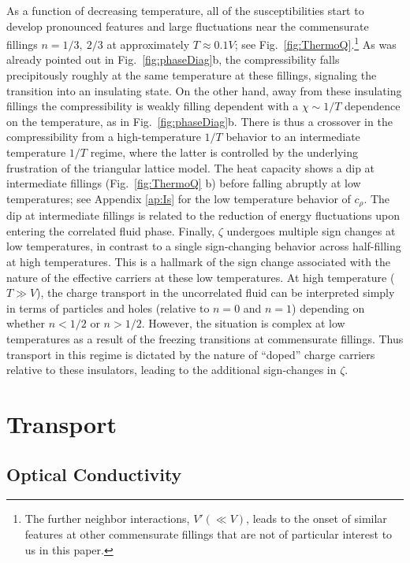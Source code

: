 \documentclass[aps,prx,onecolumn,amsmath,nofootinbib,amssymb,11pt]{revtex4-1}
\begin{document}
{As a function of decreasing temperature, all of the susceptibilities start to develop pronounced features and large fluctuations near the commensurate fillings $n=1/3,~2/3$ at approximately $T\approx 0.1V$; see Fig.~\ref{fig:ThermoQ}.\footnote{\textsf{The further neighbor interactions, $V'(\ll V)$, leads to the onset of similar features at other commensurate fillings that are not of particular interest to us in this paper.}} As was already pointed out in Fig.~\ref{fig:phaseDiag}b, the compressibility falls precipitously roughly at the same temperature at these fillings, signaling the transition into an insulating state. On the other hand, away from these insulating fillings the compressibility is weakly filling dependent with a $\chi\sim 1/T$ dependence on the temperature, as in Fig.~\ref{fig:phaseDiag}b. There is thus a crossover in the compressibility from a high-temperature $1/T$ behavior to an intermediate temperature $1/T$ regime, where the latter is controlled by the underlying frustration of the triangular lattice model. The heat capacity shows a dip at intermediate fillings (Fig.~\ref{fig:ThermoQ} b) before falling abruptly at low temperatures; see Appendix \ref{ap:Is} for the low temperature behavior of $c_\rho$. The dip at intermediate fillings is related to the reduction of energy fluctuations upon entering the correlated fluid phase. Finally, $\zeta$ undergoes multiple sign changes at low temperatures, in contrast to a single sign-changing behavior across half-filling at high temperatures. This is a hallmark of the sign change associated with the nature of the effective carriers at these low temperatures. At high temperature ($T\gg V$), the charge transport in the uncorrelated fluid can be interpreted simply in terms of particles and holes (relative to $n=0$ and $n=1$) depending on whether $n<1/2$ or $n>1/2$.  However, the situation is complex at low temperatures as a result of the freezing transitions at commensurate fillings. Thus transport in this regime is dictated by the nature of ``doped'' charge carriers relative to these insulators, leading to the additional sign-changes in $\zeta$.


\section{Transport}
\label{sec:transport}

\subsection{Optical Conductivity}
\label{sec:opt}

}
\end{document}
